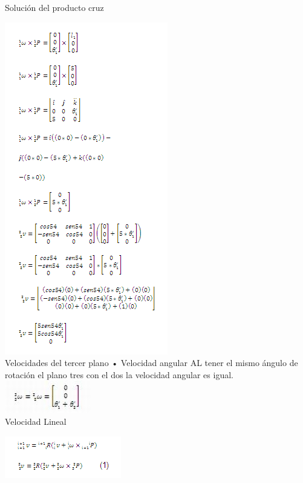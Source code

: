 \documentclass[12pt,a4paper]{report}
\begin{document}
   \vspace{50mm} %
Solución del producto cruz
   
     
   \hspace{4cm} \includegraphics{ecuacion5.png}\\
   
Velocidades del tercer plano
•	Velocidad angular
AL tener el mismo ángulo de rotación el plano tres con el dos la velocidad angular es igual.\\

  
   \hspace{4cm} \includegraphics{ecuacion6.jpg}\\
   
   
Velocidad Lineal

   
  \hspace{4cm} \includegraphics{ecuacion7.png}\\
  
\end{document}

